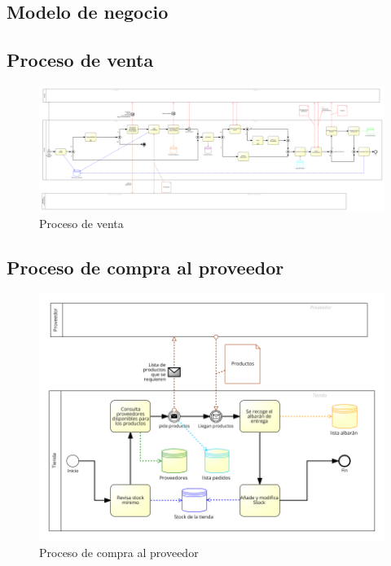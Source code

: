 \begin{landscape}
\section{Modelo de negocio}

\subsection{Proceso de venta}
\begin{figure}[H]
	\includegraphics[width=\paperwidth, center]{images/bpmn/proceso-venta.png}
	\caption{Proceso de venta}
\end{figure}
\subsection{Proceso de compra al proveedor}
\begin{figure}[H]
	\includegraphics[width=\paperwidth, center]{images/bpmn/proceso-proveedor.png}
	\caption{Proceso de compra al proveedor}
\end{figure}


\end{landscape}
